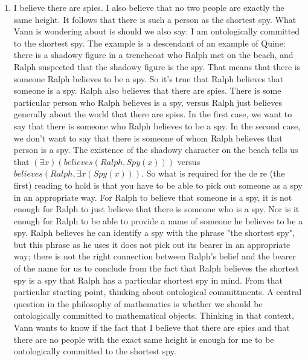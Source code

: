 \documentclass[12pt]{article}
\theoremstyle{definition}
\begin{document}
\begin{enumerate}
    \itemsep0em 
    \item
        I believe there are spies. I also believe that no two people are
        exactly the same height. It follows that there is such a person as the
        shortest spy. What Vann is wondering about is should we also say: I am
        ontologically committed to the shortest spy. The example is a
        descendant of an example of Quine: there is a shadowy figure in a
        trenchcoat who Ralph met on the beach, and Ralph suspected that the
        shadowy figure is the spy. That means that there is someone Ralph
        believes to be a spy. So it's true that Ralph believes that someone is
        a spy. Ralph also believes that there are spies. There is some
        particular person who Ralph believes is a spy, versus Ralph just
        believes generally about the world that there are spies. In the first
        case, we want to say that there is someone who Ralph believes to be a
        spy. In the second case, we don't want to say that there is someone of
        whom Ralph believes that person is a spy. The existence of the shadowy
        character on the beach tells us that $(\exists x)(believes(Ralph,
        Spy(x)))$ versus $believes(Ralph, \exists x (Spy (x)))$. So what is
        required for the de re (the first) reading to hold is that you have to
        be able to pick out someone as a spy in an appropriate way. For Ralph
        to believe that someone is a spy, it is not enough for Ralph to just
        believe that there is someone who is a spy. Nor is it enough for Ralph
        to be able to provide a name of someone he believes to be a spy. Ralph
        believes he can identify a spy with the phrase "the shortest spy", but
        this phrase as he uses it does not pick out its bearer in an
        appropriate way; there is not the right connection between Ralph's
        belief and the bearer of the name for us to conclude from the fact that
        Ralph believes the shortest spy is a spy that Ralph has a particular
        shortest spy in mind. From that particular starting point, thinking
        about ontological committments. A central question in the philosophy of
        mathematics is whether we should be ontologically committed to
        mathematical objects. Thinking in that context, Vann wants to know if
        the fact that I believe that there are spies and that there are no
        people with the exact same height is enough for me to be ontologically
        committed to the shortest spy.

\end{enumerate}
\end{document}
